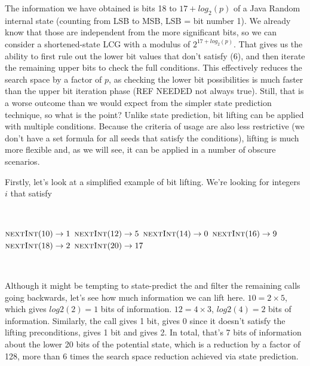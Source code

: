 \documentclass{article}
\begin{document}
The information we have obtained is bits 18 to $17 + log_2(p)$ of a Java Random internal state (counting from LSB to MSB, LSB = bit number 1). We already know that those are independent from the more significant bits, so we can consider a shortened-state LCG with a modulus of $2^{17+log_2(p)}$. That gives us the ability to first rule out the lower bit values that don’t satisfy (6), and then iterate the remaining upper bits to check the full conditions. This effectively reduces the search space by a factor of $p$, as checking the lower bit possibilities is much faster than the upper bit iteration phase (REF NEEDED not always true). Still, that is a worse outcome than we would expect from the simpler state prediction technique, so what is the point? Unlike state prediction, bit lifting can be applied with multiple conditions. Because the criteria of usage are also less restrictive (we don’t have a set formula for all seeds that satisfy the conditions), lifting is much more flexible and, as we will see, it can be applied in a number of obscure scenarios.

Firstly, let’s look at a simplified example of bit lifting. We’re looking for integers $i$ that satisfy

\
\begin{algorithmic}
\State {}
\State $\Call{nextInt}{10} \to 1$
\State $\Call{nextInt}{12} \to 5$
\State $\Call{nextInt}{14} \to 0$
\State $\Call{nextInt}{16} \to 9$
\State $\Call{nextInt}{18} \to 2$
\State $\Call{nextInt}{20} \to 17$
\end{algorithmic}
\ \

Although it might be tempting to state-predict the  and filter the remaining calls going backwards, let’s see how much information we can lift here. $10 = 2 \times 5$, which gives $log2(2) = 1$ bits of information. $12 = 4 \times 3$, $log2(4) = 2$ bits of information. Similarly, the  call gives 1 bit,  gives 0 since it doesn’t satisfy the lifting preconditions,  gives 1 bit and  gives 2. In total, that’s 7 bits of information about the lower 20 bits of the potential state, which is a reduction by a factor of 128, more than 6 times the search space reduction achieved via state prediction. %

\end{document}
